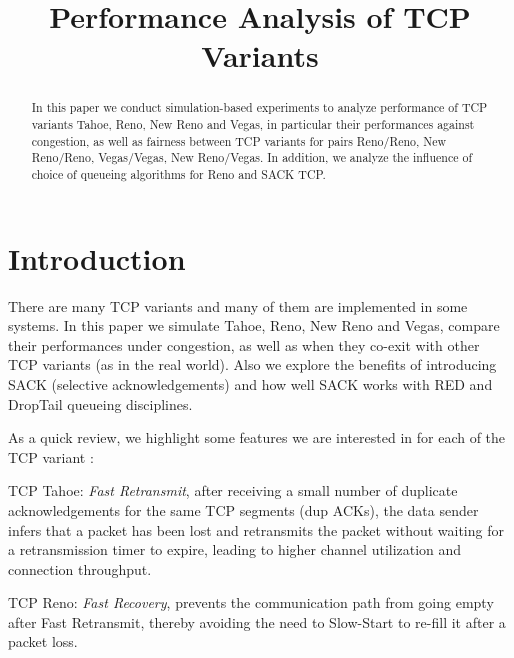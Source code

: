 \documentclass[10pt, conference]{IEEEtran/IEEEtran}
\begin{document}
\title{Performance Analysis of TCP Variants}

\author{
\and
{}
}
\maketitle
\begin{abstract}
In this paper we conduct simulation-based experiments to analyze performance of  TCP variants Tahoe, Reno, New Reno and Vegas, in particular their performances against congestion, as well as fairness between TCP variants for pairs Reno/Reno, New Reno/Reno, Vegas/Vegas, New Reno/Vegas. In addition, we analyze the influence of choice of queueing algorithms for Reno and SACK TCP.
\end{abstract}
\section{Introduction}
There are many TCP variants and many of them are implemented in some systems. In this paper we simulate Tahoe, Reno, New Reno and Vegas, compare their performances under congestion, as well as when they co-exit with other TCP variants (as in the real world). Also we explore the benefits of introducing SACK (selective acknowledgements)  and how well SACK works with RED and DropTail queueing disciplines.

As a quick review, we highlight some features we are interested in for each of the TCP variant \cite{sim}:

TCP Tahoe: \textit{Fast Retransmit}, after receiving a small number of duplicate acknowledgements for the same TCP segments (dup ACKs), the data sender infers that a packet has been lost and retransmits the packet without waiting for a retransmission timer to expire, leading to higher channel utilization and connection throughput.

TCP Reno: \textit{Fast Recovery}, prevents the communication path from going empty after Fast Retransmit, thereby avoiding the need to Slow-Start to re-fill it after a packet loss.
\end{document}
